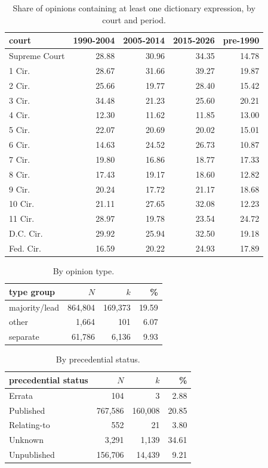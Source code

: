 \begin{table}[t]\centering\small
\begin{tabular}{lrrrr}
\toprule
court & 1990-2004 & 2005-2014 & 2015-2026 & pre-1990 \\
\midrule
Supreme Court & 28.88 & 30.96 & 34.35 & 14.78 \\
1 Cir. & 28.67 & 31.66 & 39.27 & 19.87 \\
2 Cir. & 25.66 & 19.77 & 28.40 & 15.42 \\
3 Cir. & 34.48 & 21.23 & 25.60 & 20.21 \\
4 Cir. & 12.30 & 11.62 & 11.85 & 13.00 \\
5 Cir. & 22.07 & 20.69 & 20.02 & 15.01 \\
6 Cir. & 14.63 & 24.52 & 26.73 & 10.87 \\
7 Cir. & 19.80 & 16.86 & 18.77 & 17.33 \\
8 Cir. & 17.43 & 19.17 & 18.60 & 12.82 \\
9 Cir. & 20.24 & 17.72 & 21.17 & 18.68 \\
10 Cir. & 21.11 & 27.65 & 32.08 & 12.23 \\
11 Cir. & 28.97 & 19.78 & 23.54 & 24.72 \\
D.C. Cir. & 29.92 & 25.94 & 32.50 & 19.18 \\
Fed. Cir. & 16.59 & 20.22 & 24.93 & 17.89 \\
\bottomrule
\end{tabular}
\caption{Share of opinions containing at least one dictionary expression, by court and period.}\label{tab:cp}
\end{table}

\begin{table}[t]\centering\small
\begin{tabular}{lrrr}
\toprule
type group & $N$ & $k$ & \% \\
\midrule
majority/lead & 864,804 & 169,373 & 19.59 \\
other & 1,664 & 101 & 6.07 \\
separate & 61,786 & 6,136 & 9.93 \\
\bottomrule
\end{tabular}
\caption{By opinion type.}\label{tab:type_group}
\end{table}

\begin{table}[t]\centering\small
\begin{tabular}{lrrr}
\toprule
precedential status & $N$ & $k$ & \% \\
\midrule
Errata & 104 & 3 & 2.88 \\
Published & 767,586 & 160,008 & 20.85 \\
Relating-to & 552 & 21 & 3.80 \\
Unknown & 3,291 & 1,139 & 34.61 \\
Unpublished & 156,706 & 14,439 & 9.21 \\
\bottomrule
\end{tabular}
\caption{By precedential status.}\label{tab:precedential_status}
\end{table}
